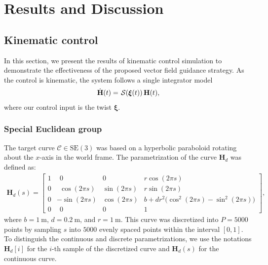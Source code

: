 \chapter{Results and Discussion}\label{ch:results}
\section{Kinematic control}
In this section, we present the results of  kinematic control simulation to demonstrate the effectiveness of the proposed vector field guidance strategy.  As the control is kinematic, the system follows a single integrator model
\begin{align}
    \dot{\mathbf{H}}(t) = \SL[\boldsymbol{\xi}(t)]\mathbf{H}(t),
\end{align}
where our control input is the twist $\boldsymbol{\xi}$.
\subsection{Special Euclidean group}
The target curve $\mathcal{C}\in\text{SE}(3)$ was based on a hyperbolic paraboloid rotating about the $x$-axis in the world frame. The parametrization of the curve $\mathbf{H}_d$ was defined as:
\begin{align}
    \mathbf{H}_d(s) = \begin{bmatrix}
        1 & \ \ 0 & 0 & r\cos(2\pi s)\\
        0 & \ \ \cos(2\pi s) & \sin(2\pi s) & r\sin(2\pi s)\\
        0 & -\sin(2\pi s) & \cos(2\pi s) & b + dr^2\bigl(\cos^2(2\pi s) - \sin^2(2\pi s)\bigr)\\
        0 & \ \ 0 & 0 & 1
    \end{bmatrix},
\end{align}
where $b=\qty{1}{\meter}$, $d=\qty{0.2}{\meter}$, and $r=\qty{1}{\meter}$. This curve was discretized into $P=\num{5000}$ points by sampling $s$ into $\num{5000}$ evenly spaced points within the interval $[0, 1]$. To distinguish the continuous and discrete parametrizations, we use the notations $\mathbf{H}_d[i]$ for the $i$-th sample of the discretized curve and $\mathbf{H}_d(s)$ for the continuous curve.
